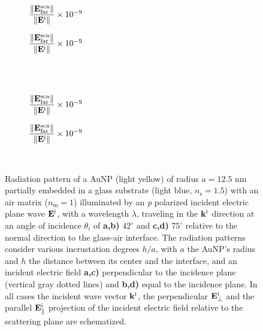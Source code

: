 \begin{figure}[h!]
    \centering
    \def\svgwidth{.8\textwidth}
    \hspace*{-.2\textwidth}%
    \vspace*{-3.65em}%
        \begin{subfigure}{.4\textwidth}\caption{%
                    \footnotesize$\dfrac{\norm{\vb{E}^\text{sca}_\text{far}}}{\norm{\vb{E}^\text{i}}} \times 10^{-9}$  }\label{sfig:Far:Inc:p2:a}\end{subfigure}%
        \begin{subfigure}{.4\textwidth}\caption{%
                    \footnotesize$\dfrac{\norm{\vb{E}^\text{sca}_\text{far}}}{\norm{\vb{E}^\text{i}}} \times 10^{-9}$  }\label{sfig:Far:Inc:p2:b}\end{subfigure}\\
    \\[-.75em]
    \def\svgwidth{.8\textwidth}
    \hspace*{-.21\textwidth}%
    \vspace*{-.7em}%
        \begin{subfigure}{.4\textwidth}\caption{%
                    \footnotesize$\dfrac{\norm{\vb{E}^\text{sca}_\text{far}}}{\norm{\vb{E}^\text{i}}} \times 10^{-9}$  }\label{sfig:Far:Inc:p2:c}\end{subfigure}%
        \begin{subfigure}{.4\textwidth}\caption{%
                    \footnotesize$\dfrac{\norm{\vb{E}^\text{sca}_\text{far}}}{\norm{\vb{E}^\text{i}}} \times 10^{-9}$  }\label{sfig:Far:Inc:p2:d}\end{subfigure}\\
    \caption[  Radiation pattern of a AuNP supported on a substrate illuminated at oblique incidence ]{
    Radiation pattern of a AuNP (light yellow) of radius $a = 12.5$ nm partially embedded in a glass substrate (light blue, $n_\text{s} = 1.5$) with an air matrix ($n_\text{m} = 1$) illuminated by an \textit{p} polarized incident electric plane wave $\vb{E}^\text{i}$, with a wavelength $\lambda$, traveling in the $\vb{k}^\text{i}$ direction at an angle of incidence $\theta_i$ of \textbf{a,b)} $42^\circ$ and \textbf{c,d)} $75^\circ$ relative to the normal direction to the glass-air interface. The radiation patterns consider various incrustation degrees $h/a$, with $a$ the AuNP's radius and $h$ the distance between its center and the interface, and an  incident electric field \textbf{a,c)} perpendicular to the incidence plane (vertical gray dotted lines) and \textbf{b,d)} equal to the incidence plane. In all cases the incident wave vector $\vb{k}^\text{i}$, the perpendicular $\vb{E}_\perp^\text{i}$ and the  parallel $\vb{E}_\parallel^\text{i}$ projection of the incident electric field relative to the scattering plane are schematized.%
    }
    \label{fig:Far:Inc:p2}
\end{figure}

